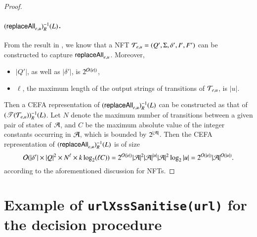 \begin{proof}
	\paragraph*{$(\mathsf{replaceAll}_{e,u})^{-1}_R(L)$.}
	From the result in \cite{CCH+18}, we know that  a NFT $\mathcal{T}_{e,u}=(Q', \Sigma, \delta', I', F')$ can be constructed to capture $\mathsf{replaceAll}_{e,u}$.  Moreover, 
	\begin{itemize}
		\item $|Q'|$, as well as $|\delta'|$, is $2^{\mathcal{O}(|e|)}$,
		\item $\ell$, the maximum length of the output strings of transitions of $\mathcal{T}_{e,u}$, is $|u|$.
	\end{itemize}
	Then a CEFA representation of $(\mathsf{replaceAll}_{e,u})^{-1}_R(L)$ can be constructed as that of $(\mathscr{T}(\mathcal{T}_{e,u}))^{-1}_R(L)$.
	Let $N$ denote the maximum number of transitions between a given pair of states of $\mathcal{A}$, and $C$ be the maximum absolute value of the integer constants occurring in $\mathcal{A}$, which is bounded by $2^{|\mathcal{A}|}$. Then the CEFA representation of $(\mathsf{replaceAll}_{e,u})^{-1}_R(L)$ is of size 
	\[
	\mathcal{O}(|\delta'| \times |Q|^2 \times N^\ell \times k \log_2 (\ell C)) = 2^{\mathcal{O}(|e|)} |\mathcal{A}|^2 |\mathcal{A}|^{|u|} |\mathcal{A}|^2 \log_2 |u|=2^{\mathcal{O}(|e|)} |\mathcal{A}|^{\mathcal{O}(|u|)}.
	\]
	according to the aforementioned discussion for NFTs.
\end{proof}


\section{Example of {\tt urlXssSanitise(url)} for the decision procedure} \label{app:urlexample}


